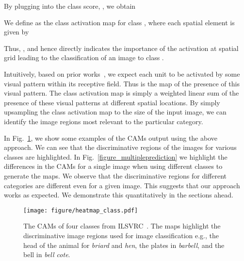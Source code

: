 \documentclass[10pt,twocolumn,letterpaper]{article}
\begin{document}
By plugging  into the class score, , we obtain

We define  as the class activation map for class , where each spatial element is given by
 
Thus, , and hence  directly indicates the importance of the activation at spatial grid  leading to the classification of an image to class .

Intuitively, based on prior works~\cite{zhou2014object,zeiler2014visualizing}, we expect each unit to be activated by some visual pattern within its receptive field. Thus  is the map of the presence of this visual pattern. The class activation map is simply a weighted linear sum of the presence of these visual patterns at different spatial locations. By simply upsampling the class activation map to the size of the input image, we can identify the image regions most relevant to the particular category.

In Fig.~\ref{figure_examplemapping}, we show some examples of the CAMs output using the above approach. We can see that the discriminative regions of the images for various classes are highlighted. In Fig.~\ref{figure_multipleprediction} we highlight the differences in the CAMs for a single image when using different classes  to generate the maps. We observe that the discriminative regions for different categories are different even for a given image. This suggests that our approach works as expected. We demonstrate this quantitatively in the sections ahead.







\begin{figure}
\begin{center}
\texttt{[image: figure/heatmap\_class.pdf]}
\end{center}
\vspace*{-4mm}
 \caption{The CAMs of four classes from ILSVRC~\cite{ILSVRCijcv15}. The maps highlight the discriminative image regions used for image classification e.g., the head of the animal for \textit{briard} and \textit{hen}, the plates in \textit{barbell}, and the bell in \textit{bell cote}.}\label{figure_examplemapping}
\end{figure}
\end{document}
